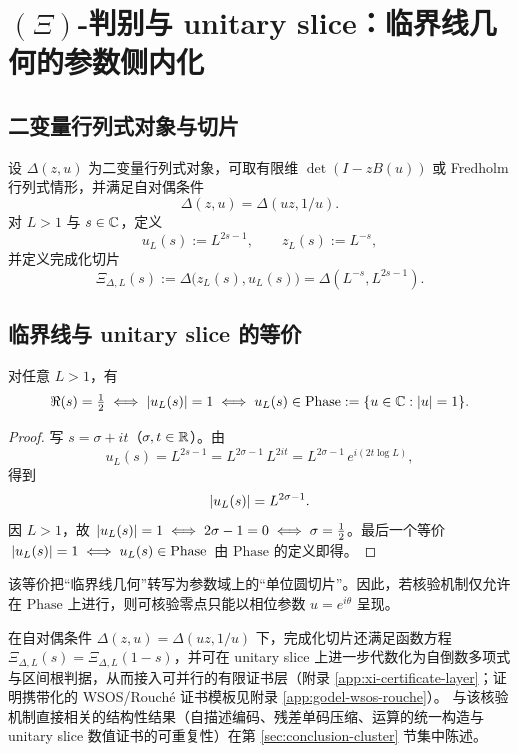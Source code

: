 \section{\texorpdfstring{$(\Xi)$}{(Xi)}-判别与 unitary slice：临界线几何的参数侧内化}\label{sec:xi-unitary-slice}

\subsection{二变量行列式对象与切片}
设 $\Delta(z,u)$ 为二变量行列式对象，可取有限维 $\det(I-zB(u))$ 或 Fredholm 行列式情形，并满足自对偶条件
$$
\Delta(z,u)=\Delta(uz,1/u).
$$
对 $L>1$ 与 $s\in\mathbb{C}$，定义
$$
u_L(s):=L^{2s-1},\qquad z_L(s):=L^{-s},
$$
并定义完成化切片
$$
\Xi_{\Delta,L}(s):=\Delta\bigl(z_L(s),u_L(s)\bigr)=\Delta(L^{-s},L^{2s-1}).
$$

\subsection{临界线与 unitary slice 的等价}
\begin{proposition}\label{prop:critical-line-unitary-slice}
对任意 $L>1$，有
$$
\Re(s)=\tfrac12 \iff \left\lvert u_L(s)\right\rvert=1 \iff u_L(s)\in \mathrm{Phase}:=\{u\in\mathbb{C}:\left\lvert u\right\rvert=1\}.
$$
\end{proposition}
\begin{proof}
写 $s=\sigma+it$（$\sigma,t\in\mathbb{R}$）。由
$$
u_L(s)=L^{2s-1}=L^{2\sigma-1}\,L^{2it}=L^{2\sigma-1}\,e^{i(2t\log L)},
$$
得到
$$
\left\lvert u_L(s)\right\rvert=L^{2\sigma-1}.
$$
因 $L>1$，故 $\left\lvert u_L(s)\right\rvert=1 \iff 2\sigma-1=0 \iff \sigma=\tfrac12$。最后一个等价 $\,\left\lvert u_L(s)\right\rvert=1\iff u_L(s)\in\mathrm{Phase}\,$ 由 $\mathrm{Phase}$ 的定义即得。
\end{proof}

该等价把“临界线几何”转写为参数域上的“单位圆切片”。因此，若核验机制仅允许在 $\mathrm{Phase}$ 上进行，则可核验零点只能以相位参数 $u=e^{i\theta}$ 呈现。

在自对偶条件 $\Delta(z,u)=\Delta(uz,1/u)$ 下，完成化切片还满足函数方程 $\Xi_{\Delta,L}(s)=\Xi_{\Delta,L}(1-s)$，并可在 unitary slice 上进一步代数化为自倒数多项式与区间根判据，从而接入可并行的有限证书层（附录 \ref{app:xi-certificate-layer}；证明携带化的 WSOS/Rouché 证书模板见附录 \ref{app:godel-wsos-rouche}）。
与该核验机制直接相关的结构性结果（自描述编码、残差单码压缩、运算的统一构造与 unitary slice 数值证书的可重复性）在第 \ref{sec:conclusion-cluster} 节集中陈述。

